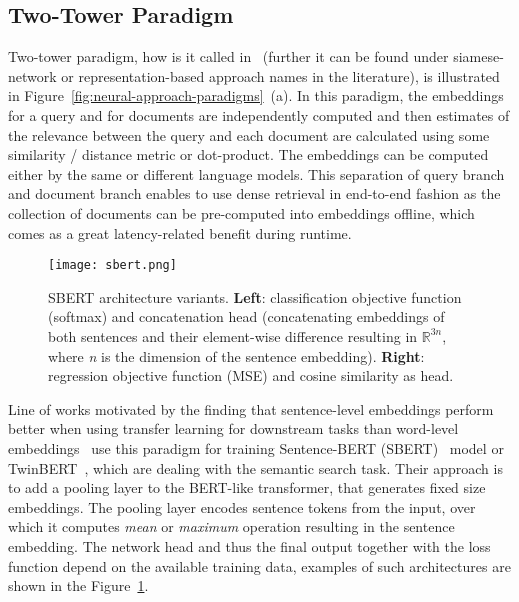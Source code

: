 \subsection{Two-Tower Paradigm}
\label{section:two-tower}
    Two-tower paradigm, how is it called in~\parencite{chang2020twotower} (further it can be found under siamese-network or representation-based approach names in the literature), is illustrated in Figure~\ref{fig:neural-approach-paradigms}~(a). In this paradigm, the embeddings for a query and for documents are independently computed and then estimates of the relevance between the query and each document are calculated using some similarity / distance metric or dot-product. The embeddings can be computed either by the same or different language models. %
    This separation of query branch and document branch enables to use dense retrieval in end-to-end fashion as the collection of documents can be pre-computed into embeddings offline, which comes as a great latency-related benefit during runtime.
 
    \begin{figure}[htp]
        \texttt{[image: sbert.png]}
        \centering
        \caption[SBERT architectures]{SBERT architecture variants. 
        \textbf{Left}: classification objective function (softmax) and concatenation head (concatenating embeddings of both sentences and their element-wise difference resulting in $\mathbb{R}^{3n}$, where \emph{n} is the dimension of the sentence embedding).
        \textbf{Right}: regression objective function (MSE) and cosine similarity as head.~\parencite{Reimers_2019-SBERT}}
        \label{fig:sbert}
    \end{figure}
    
    Line of works motivated by the finding that sentence-level embeddings perform better when using transfer learning for downstream tasks than word-level embeddings~\parencite{cer2018universal} use this paradigm for training Sentence-BERT (SBERT)~\parencite{Reimers_2019-SBERT} model or TwinBERT~\parencite{lu2020twinbert}, which are dealing with the semantic search task. Their approach is to add a pooling layer to the BERT-like transformer, that generates fixed size embeddings. The pooling layer encodes sentence tokens from the input, over which it computes \emph{mean} or \emph{maximum} operation resulting in the sentence embedding. The network head and thus the final output together with the loss function depend on the available training data, examples of such architectures are shown in the Figure~\ref{fig:sbert}.
    
